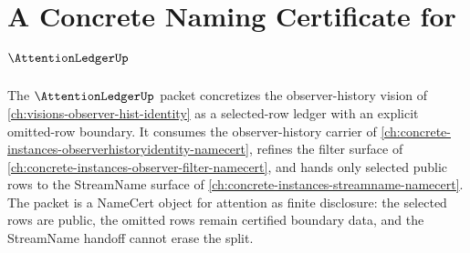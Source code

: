 \chapter{A Concrete Naming Certificate for $\AttentionLedgerUp$}
\label{ch:concrete-instances-attention-ledger-namecert}

The $\AttentionLedgerUp$ packet concretizes the observer-history vision of \autoref{ch:visions-observer-hist-identity} as a selected-row ledger with an explicit omitted-row boundary. It consumes the observer-history carrier of \autoref{ch:concrete-instances-observerhistoryidentity-namecert}, refines the filter surface of \autoref{ch:concrete-instances-observer-filter-namecert}, and hands only selected public rows to the StreamName surface of \autoref{ch:concrete-instances-streamname-namecert}. The packet is a NameCert object for attention as finite disclosure: the selected rows are public, the omitted rows remain certified boundary data, and the StreamName handoff cannot erase the split.

